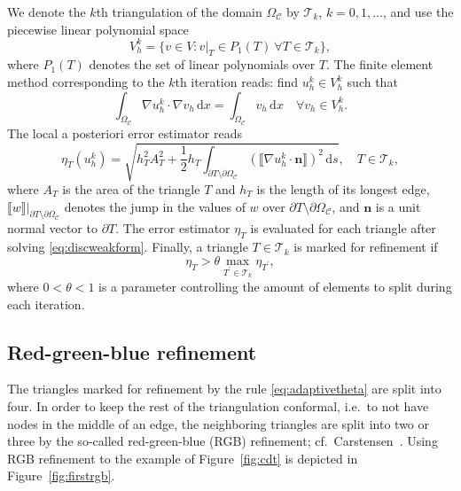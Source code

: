 \documentclass[11pt]{article}
\begin{document}
We denote the \(k\)th triangulation of the
domain \(\Omega_{\mathcal{C}}\) by \(\mathcal{T}_k\), \(k=0,1,\dots\), and
use the piecewise linear polynomial space
$$V_h^k = \{ v \in V : v|_T \in P_1(T)~\forall T \in \mathcal{T}_k \},$$
where $P_1(T)$ denotes the set of linear polynomials over $T$.
The finite element method corresponding to the \(k\)th iteration reads:
find \(u_h^k \in V_h^k\) such that
\begin{equation}
   \label{eq:discweakform}
   \int_{\Omega_{\mathcal{C}}} \nabla u_h^k \cdot \nabla v_h \,\mathrm{d}x = \int_{\Omega_{\mathcal{C}}} v_h\,\mathrm{d}x \quad \forall v_h \in V_h^k.
\end{equation}
The local a posteriori error estimator
reads
\begin{equation}
        \eta_T(u_h^k) = \sqrt{h_T^2 A_T^2 + \frac12 h_T \int_{\partial T \setminus \partial \Omega_{\mathcal{C}}} (\llbracket \nabla u_h^k \cdot \boldsymbol{n} \rrbracket)^2 \,\mathrm{d}s}, \quad T \in \mathcal{T}_k,
\end{equation}
where $A_T$ is the area of the triangle $T$ and $h_T$ is the length of its longest edge, $\llbracket w \rrbracket |_{\partial T \setminus \partial \Omega_{\mathcal{C}}}$ denotes the jump in the values of
$w$ over $\partial T \setminus \partial \Omega_{\mathcal{C}}$, and $\boldsymbol{n}$ is a unit normal vector to
$\partial T$.
The error estimator $\eta_T$ is evaluated for each triangle
after solving \eqref{eq:discweakform}.
Finally, a triangle $T \in \mathcal{T}_k$ is marked for refinement if
\begin{equation}
  \label{eq:adaptivetheta}
   \eta_T > \theta \max_{T^\prime \in \mathcal{T}_k} \eta_{T^\prime},
\end{equation}
where $0 < \theta < 1$ is a parameter controlling the amount
of elements to split during each iteration. \cite{Verf_rth_2013}

\subsection{Red-green-blue refinement}
\label{sec:rgb}

The triangles marked for refinement by the rule \eqref{eq:adaptivetheta} are
split into four.  In order to keep the rest of the triangulation conformal,
i.e.~to not have nodes in the middle of an edge, the neighboring triangles
are split into two or three by the so-called red-green-blue (RGB) refinement;
cf.~Carstensen~\cite{carstensen2004adaptive}.  Using RGB refinement to the
example of Figure~\ref{fig:cdt} is depicted in Figure~\ref{fig:firstrgb}.
\end{document}

